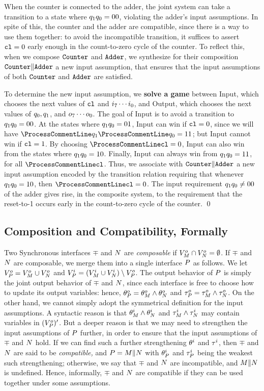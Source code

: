 When the counter is connected to the adder, the joint system can
take a transition to a state where $q_1 q_0 = 00$, violating
the adder's input assumptions. In spite of this, the counter and
the adder are compatible, since there is a way to use them
together: to avoid the incompatible transition, it suffices to
assert ${\tt cl} = 0$ early enough in the count-to-zero cycle of
the counter. To reflect this, when we compose ${\tt Counter}$ and
${\tt Adder}$, we synthesize for their composition ${\tt Counter} \| {\tt Adder}$
a new input assumption, that ensures that the input assumptions of
both ${\tt Counter}$ and ${\tt Adder}$ are satisfied.

To determine the new input assumption, we \textbf{solve a game}
between Input, which chooses the next values of ${\tt cl}$ and
$i_7\cdots i_0$, and Output, which chooses the next values of
$q_0,q_1$, and $o_7 \cdots o_0$. The goal of Input is to
avoid a transition to $q_1 q_0 = 00$. At the states where
$q_1 q_0 = 01$, Input can win if ${\tt cl} = 0$, since
we will have $\nx{q}_1 \nx{q}_0 = 11$; but Input cannot win if
${\tt cl} = 1$. By choosing $\nx{\itoone} = 0$, Input can also win
from the states where $q_1 q_0 = 10$. Finally, Input can
always win from
$q_1 q_0 = 11$, for all $\nx{\itoone}$. Thus, we associate
with ${\tt Counter} \| {\tt Adder}$ a new input assumption encoded by the
transition relation requiring that whenever $q_1 q_0 = 10$,
then $\nx{\itoone} = 0$. The input requirement $q_1 q_0 \neq
00$ of the adder gives rise, in the composite system, to the
requirement that the reset-to-1 occurs early in the count-to-zero
cycle of the counter. \qed

\subsection{Composition and Compatibility, Formally}
Two Synchronous interfaces $\mp$ and $N$ are {\em composable\/}
if ${ V}^o_M \cap {V}^o_N = \emptyset$. If $\mp$ and $N$
are composable, we merge them into a single interface $P$ as
follows. We let ${ V}^o_P = { V}^o_M \cup {V}^o_N$ and
${ V}^i_P = ({ V}^i_M \cup {V}^i_N) \setminus {V}^o_P$.
The output behavior of $P$ is simply the joint output behavior
of $\mp$ and $N$, since each interface is free to choose how to
update its output variables: hence, $\theta^o_P = \theta^o_M \wedge
\theta^o_N$ and $\tau^o_P = \tau^o_M \wedge \tau^o_N$. On
the other hand, we cannot simply adopt the symmetrical definition
for the input assumptions. A syntactic reason is that $\theta^i_M
\wedge \theta^i_N$ and $\tau^i_M \wedge \tau^i_N$ may contain
variables in $({ V}^o_P)'$. But a deeper reason is that we may
need to strengthen the input assumptions of $P$ further, in
order to ensure that the input assumptions of $\mp$ and $N$
hold. If we can find such a further strengthening $\theta^i$ and
$\tau^i$, then $\mp$ and $N$ are said to be {\em compatible,}
and $P = M \| N$ with $\theta^i_P$ and $\tau^i_P$ being
the weakest such strengthening; otherwise, we say that $\mp$ and
$N$ are incompatible, and $M\|N$ is undefined. Hence,
informally, $\mp$ and $N$ are compatible if they can be used
together under some assumptions.

